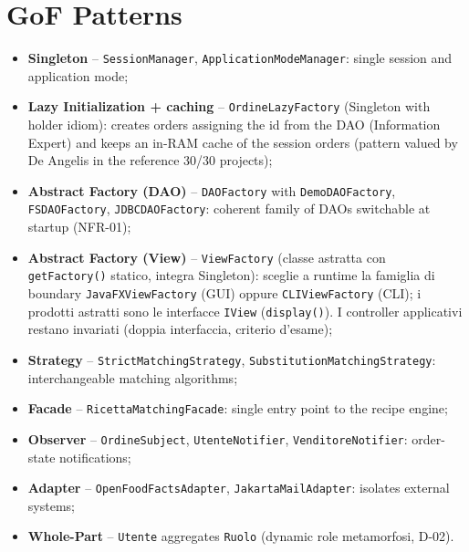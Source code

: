 \section{GoF Patterns}

\begin{itemize}
    \item \textbf{Singleton} -- \texttt{SessionManager},
    \texttt{ApplicationModeManager}: single session and application mode;
    \item \textbf{Lazy Initialization + caching} -- \texttt{OrdineLazyFactory}
    (Singleton with holder idiom): creates orders assigning the id from the
    DAO (Information Expert) and keeps an in-RAM cache of the session orders
    (pattern valued by De Angelis in the reference 30/30 projects);
    \item \textbf{Abstract Factory (DAO)} -- \texttt{DAOFactory} with
    \texttt{DemoDAOFactory}, \texttt{FSDAOFactory}, \texttt{JDBCDAOFactory}:
    coherent family of DAOs switchable at startup (NFR-01);
    \item \textbf{Abstract Factory (View)} -- \texttt{ViewFactory} (classe
    astratta con \texttt{getFactory()} statico, integra Singleton): sceglie a
    runtime la famiglia di boundary \texttt{JavaFXViewFactory} (GUI) oppure
    \texttt{CLIViewFactory} (CLI); i prodotti astratti sono le interfacce
    \texttt{IView} (\texttt{display()}). I controller applicativi restano
    invariati (doppia interfaccia, criterio d'esame);
    \item \textbf{Strategy} -- \texttt{StrictMatchingStrategy},
    \texttt{SubstitutionMatchingStrategy}: interchangeable matching algorithms;
    \item \textbf{Facade} -- \texttt{RicettaMatchingFacade}: single entry
    point to the recipe engine;
    \item \textbf{Observer} -- \texttt{OrdineSubject},
    \texttt{UtenteNotifier}, \texttt{VenditoreNotifier}: order-state
    notifications;
    \item \textbf{Adapter} -- \texttt{OpenFoodFactsAdapter},
    \texttt{JakartaMailAdapter}: isolates external systems;
    \item \textbf{Whole-Part} -- \texttt{Utente} aggregates \texttt{Ruolo}
    (dynamic role metamorfosi, D-02).
\end{itemize}

